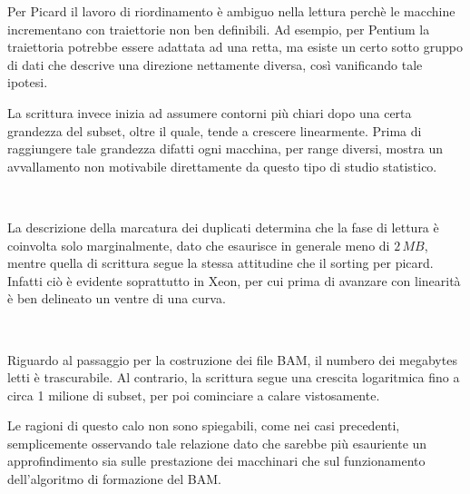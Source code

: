 Per Picard il lavoro di riordinamento è ambiguo nella lettura perchè le macchine incrementano con traiettorie non ben definibili.
Ad esempio, per Pentium la traiettoria potrebbe essere adattata ad una retta, ma esiste un certo sotto gruppo di dati che descrive una direzione nettamente diversa, così vanificando tale ipotesi.

La scrittura invece inizia ad assumere contorni più chiari dopo una certa grandezza del subset, oltre il quale, tende a crescere linearmente. 
Prima di raggiungere tale grandezza difatti ogni macchina, per range diversi, mostra un avvallamento non motivabile direttamente da questo tipo di studio statistico.  

\begin{figure}[H]
\centering
{} \quad
{} \\
\caption{}
\label{fig:IOMd}
\end{figure}

La descrizione della marcatura dei duplicati determina che la fase di lettura è coinvolta solo marginalmente, dato che esaurisce in generale meno di $2\,MB$, mentre quella di scrittura segue la stessa attitudine che il sorting per picard.
Infatti ciò è evidente soprattutto in Xeon, per cui prima di avanzare con linearità è ben delineato un ventre di una curva.  

\begin{figure}[H]
\centering
{} \quad
{} \\
\caption{}
\label{fig:IOBB}
\end{figure}

Riguardo al passaggio per la costruzione dei file BAM, il numbero dei megabytes letti è trascurabile. 
Al contrario, la scrittura segue una crescita logaritmica fino a circa 1 milione di subset, per poi cominciare a calare vistosamente.

Le ragioni di questo calo non sono spiegabili, come nei casi precedenti, semplicemente osservando tale relazione dato che sarebbe più esauriente un approfindimento sia sulle prestazione dei macchinari che sul funzionamento dell'algoritmo di formazione del BAM. 

